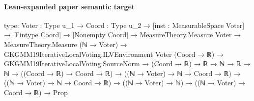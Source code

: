 \documentclass[10pt]{article}
\begin{document}
\paragraph{Lean-expanded paper semantic target}
\begin{ReviewVerbatim}
type:
{Voter : Type u_1} →
  {Coord : Type u_2} →
    [inst : MeasurableSpace Voter] →
      [Fintype Coord] →
        [Nonempty Coord] →
          MeasureTheory.Measure Voter →
            MeasureTheory.Measure (ℕ → Voter) →
              GKGMM19IterativeLocalVoting.ILVEnvironment Voter (Coord → ℝ) →
                GKGMM19IterativeLocalVoting.SourceNorm →
                  (Coord → ℝ) →
                    ℝ →
                      ℕ →
                        ℝ →
                          ℕ →
                            ((Coord → ℝ) → Coord → ℝ) →
                              ((ℕ → Voter) → ℕ → Coord → ℝ) →
                                ((ℕ → Voter) → ℕ → Coord → ℝ) → ((ℕ → Voter) → ℕ) → ((ℕ → Voter) → Coord → ℝ) → Prop


\end{ReviewVerbatim}
\end{document}

